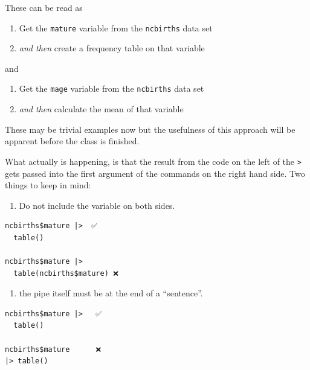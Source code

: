 \documentclass[
  letterpaper,
  DIV=11,
  numbers=noendperiod,
  oneside]{scrreprt}
\providecommand{\tightlist}{%
  \setlength{\itemsep}{0pt}\setlength{\parskip}{0pt}}\usepackage{longtable,booktabs,array}
\begin{document}
These can be read as

\begin{enumerate}
\def\labelenumi{\arabic{enumi}.}
\tightlist
\item
  Get the \texttt{mature} variable from the \texttt{ncbirths} data set
\item
  \emph{and then} create a frequency table on that variable
\end{enumerate}

and

\begin{enumerate}
\def\labelenumi{\arabic{enumi}.}
\tightlist
\item
  Get the \texttt{mage} variable from the \texttt{ncbirths} data set
\item
  \emph{and then} calculate the mean of that variable
\end{enumerate}

These may be trivial examples now but the usefulness of this approach
will be apparent before the class is finished.

\begin{tcolorbox}[enhanced jigsaw, bottomrule=.15mm, colback=white, colframe=quarto-callout-important-color-frame, toprule=.15mm, coltitle=black, rightrule=.15mm, opacitybacktitle=0.6, colbacktitle=quarto-callout-important-color!10!white, toptitle=1mm, leftrule=.75mm, breakable, bottomtitle=1mm, titlerule=0mm, title=\textcolor{quarto-callout-important-color}{\faExclamation}\hspace{0.5em}{Behind the scenes}, arc=.35mm, left=2mm, opacityback=0]

What actually is happening, is that the result from the code on the left
of the \texttt{\textbar{}\textgreater{}} gets passed into the first
argument of the commands on the right hand side. Two things to keep in
mind:

\begin{enumerate}
\def\labelenumi{\arabic{enumi}.}
\tightlist
\item
  Do not include the variable on both sides.
\end{enumerate}

\begin{verbatim}
ncbirths$mature |>  ✅
  table()    
  
ncbirths$mature |> 
  table(ncbirths$mature) ❌
\end{verbatim}

\begin{enumerate}
\def\labelenumi{\arabic{enumi}.}
\setcounter{enumi}{1}
\tightlist
\item
  the pipe itself must be at the end of a ``sentence''.
\end{enumerate}

\begin{verbatim}
ncbirths$mature |>   ✅
  table()

ncbirths$mature      ❌
|> table()
\end{verbatim}

\end{tcolorbox}
\end{document}
